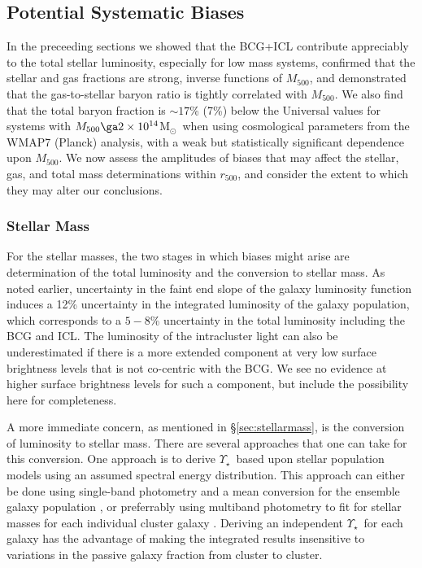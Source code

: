 \documentclass[preprint]{emulateapj}
\newcommand{\msun}{M$_\odot$}
\newcommand\rfive{$r_{500}$}
\newcommand\mfive{${M}_{500}$}
\newcommand{\mlrat}{$\Upsilon_\star$}
\begin{document}
\subsection{Potential Systematic Biases}
\label{sec:biases}

In the preceeding sections we showed that the BCG+ICL contribute
appreciably to the total stellar luminosity, especially for low mass
systems, confirmed that the stellar and gas fractions are strong,
inverse functions of \mfive, and demonstrated that the gas-to-stellar
baryon ratio is tightly correlated with \mfive. We also find that the
total baryon fraction is $\sim 17$\% (7\%) below the Universal values for
  systems with $M_{500}\ga 2\times10^{14}$\msun\ when using cosmological parameters
from the WMAP7 (Planck) analysis, with a weak but
statistically significant dependence upon \mfive. We now assess the
amplitudes of biases that may affect the stellar, gas, and total mass
determinations within \rfive, and consider the extent to which they
may alter our conclusions.

\subsubsection{Stellar Mass}
\label{sec:stellarbias}

For the stellar masses, the two stages in which biases might arise are
determination of the total luminosity and the conversion to stellar
mass.  As noted earlier, uncertainty in the faint end slope of the
galaxy luminosity function induces a 12\% uncertainty in the
integrated luminosity of the galaxy population, which corresponds to a
$5-8$\% uncertainty in the total luminosity including the BCG and
ICL. The luminosity of the intracluster light can also %
be underestimated if there is a more extended component at very low
surface brightness levels that is not co-centric with the BCG. We see
no evidence at higher surface brightness levels for such a component,
but include the possibility here for completeness.

A more immediate concern, as mentioned in \S \ref{sec:stellarmass}, is
the conversion of luminosity to stellar mass. There are several
approaches that one can take for this conversion. One approach is to
derive \mlrat\ based upon stellar population models using an assumed
spectral energy distribution.  This approach can either be done using
single-band photometry and a mean conversion for the ensemble galaxy
population \citep{lin2003,giodini2009,zhang2011,lagana2011}, or
preferrably using multiband photometry to fit for stellar masses for
each individual cluster galaxy \citep{leauthaud2012}. Deriving an
independent \mlrat\ for each galaxy has the advantage of making the
integrated results insensitive to variations in the passive galaxy
fraction from cluster to cluster.
\end{document}
